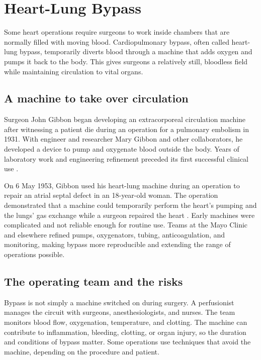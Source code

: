 \documentclass[12pt,oneside]{book}
\begin{document}
\chapter[Heart-Lung Bypass]{Heart-Lung Bypass}

Some heart operations require surgeons to work inside chambers that are
normally filled with moving blood. Cardiopulmonary bypass, often called
heart-lung bypass, temporarily diverts blood through a machine that adds
oxygen and pumps it back to the body. This gives surgeons a relatively
still, bloodless field while maintaining circulation to vital organs.

\section{A machine to take over circulation}
Surgeon John Gibbon began developing an extracorporeal circulation
machine after witnessing a patient die during an operation for a
pulmonary embolism in 1931. With engineer and researcher Mary Gibbon and
other collaborators, he developed a device to pump and oxygenate blood
outside the body. Years of laboratory work and engineering refinement
preceded its first successful clinical use \cite{gibbonHeartLungMachine,smithsonianGibbon}.

On 6 May 1953, Gibbon used his heart-lung machine during an operation to
repair an atrial septal defect in an 18-year-old woman. The operation
demonstrated that a machine could temporarily perform the heart's pumping
and the lungs' gas exchange while a surgeon repaired the heart
\cite{gibbonHeartLungMachine}. Early machines were complicated and not
reliable enough for routine use. Teams at the Mayo Clinic and elsewhere
refined pumps, oxygenators, tubing, anticoagulation, and monitoring,
making bypass more reproducible and extending the range of operations
possible.

\section{The operating team and the risks}
Bypass is not simply a machine switched on during surgery. A perfusionist
manages the circuit with surgeons, anesthesiologists, and nurses. The team
monitors blood flow, oxygenation, temperature, and clotting. The machine
can contribute to inflammation, bleeding, clotting, or organ injury, so
the duration and conditions of bypass matter. Some operations use
techniques that avoid the machine, depending on the procedure and patient.
\end{document}
